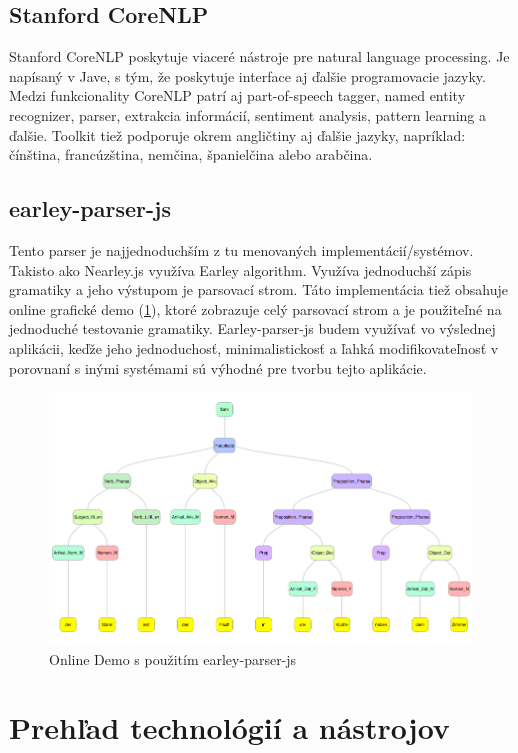 \documentclass[12pt,a4paper]{report}
\theoremstyle{definition}
\theoremstyle{remark}
\begin{document}
\subsection{Stanford CoreNLP}
Stanford CoreNLP\cite{corenlp} poskytuje viaceré nástroje pre natural language processing. Je napísaný v Jave, s tým, že poskytuje interface aj ďalšie programovacie jazyky. Medzi funkcionality CoreNLP patrí aj part-of-speech tagger, named entity recognizer, parser, extrakcia informácií, sentiment analysis, pattern learning a ďalšie. Toolkit tiež podporuje okrem angličtiny aj ďalšie jazyky, napríklad: čínština, francúzština, nemčina, španielčina alebo arabčina.

\subsection{earley-parser-js}
Tento parser je najjednoduchším z tu menovaných implementácií/systémov. Takisto ako Nearley.js využíva Earley algorithm. Využíva jednoduchší zápis gramatiky a jeho výstupom je parsovací strom. Táto implementácia tiež obsahuje online grafické demo (\ref{fig:demo}), ktoré zobrazuje celý parsovací strom a je použiteľné na jednoduché testovanie gramatiky. Earley-parser-js\cite{earley-oop} budem využívať vo výslednej aplikácii, keďže jeho jednoduchosť, minimalistickosť a ľahká modifikovateľnosť v porovnaní s inými systémami sú výhodné pre tvorbu tejto aplikácie.
\begin{figure}[H]
\includegraphics[scale=0.4]{onlineDemo}
\caption{Online Demo s použitím earley-parser-js}
  \label{fig:demo}
\end{figure}

\section{Prehľad technológií a nástrojov}
\end{document}
